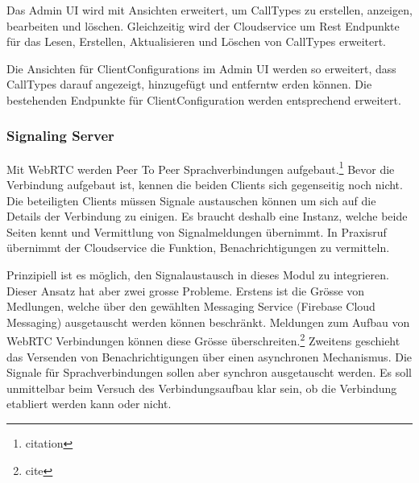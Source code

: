Das Admin UI wird mit Ansichten erweitert, um CallTypes zu erstellen, anzeigen, bearbeiten und löschen.
Gleichzeitig wird der Cloudservice um Rest Endpunkte für das Lesen, Erstellen, Aktualisieren und Löschen von CallTypes erweitert.

Die Ansichten für ClientConfigurations im Admin UI werden so erweitert, dass CallTypes darauf angezeigt, hinzugefügt und entferntw erden können.
Die bestehenden Endpunkte für ClientConfiguration werden entsprechend erweitert.

\clearpage

\subsubsection{Signaling Server}

Mit WebRTC werden Peer To Peer Sprachverbindungen aufgebaut.\footnote{citation}
Bevor die Verbindung aufgebaut ist, kennen die beiden Clients sich gegenseitig noch nicht.
Die beteiligten Clients müssen Signale austauschen können um sich auf die Details der Verbindung zu einigen.
Es braucht deshalb eine Instanz, welche beide Seiten kennt und Vermittlung von Signalmeldungen übernimmt.
In Praxisruf übernimmt der Cloudservice die Funktion, Benachrichtigungen zu vermitteln.

Prinzipiell ist es möglich, den Signalaustausch in dieses Modul zu integrieren.
Dieser Ansatz hat aber zwei grosse Probleme.
Erstens ist die Grösse von Medlungen, welche über den gewählten Messaging Service (Firebase Cloud Messaging) ausgetauscht werden können beschränkt.
Meldungen zum Aufbau von WebRTC Verbindungen können diese Grösse überschreiten.\footnote{cite}
Zweitens geschieht das Versenden von Benachrichtigungen über einen asynchronen Mechanismus.
Die Signale für Sprachverbindungen sollen aber synchron ausgetauscht werden.
Es soll unmittelbar beim Versuch des Verbindungsaufbau klar sein, ob die Verbindung etabliert werden kann oder nicht.

